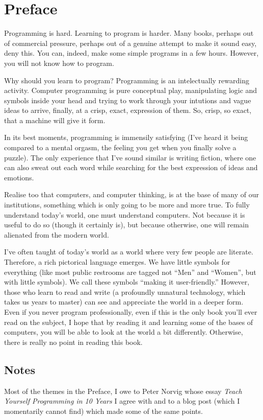 \chapter{Preface}

Programming is hard. Learning to program is harder. Many books, perhaps out of
commercial pressure, perhaps out of a genuine attempt to make it sound easy,
deny this. You can, indeed, make some simple programs in a few hours. However,
you will not know how to program.

Why should you learn to program? Programming is an intelectually rewarding
activity. Computer programming is pure conceptual play, manipulating logic and
symbols inside your head and trying to work through your intutions and vague
ideas to arrive, finally, at a crisp, exact, expression of them. So, crisp, so
exact, that a machine will give it form.

In its best moments, programming is immensily satisfying (I've heard it being
compared to a mental orgasm, the feeling you get when you finally solve a
puzzle). The only experience that I've sound similar is writing fiction, where
one can also sweat out each word while searching for the best expression of
ideas and emotions.

Realise too that computers, and computer thinking, is at the base of many of
our institutions, something which is only going to be more and more true. To
fully understand today's world, one must understand computers. Not because it
is useful to do so (though it certainly is), but because otherwise, one will
remain alienated from the modern world.

I've often taught of today's world as a world where very few people are
literate. Therefore, a rich pictorical language emerges. We have little symbols
for everything (like most public restrooms are tagged not ``Men'' and
``Women'', but with little symbols). We call these symbols ``making it
user-friendly.'' However, those who learn to read and write (a profoundly
unnatural technology, which takes us years to master) can see and appreciate
the world in a deeper form. Even if you never program professionally, even if
this is the only book you'll ever read on the subject, I hope that by reading
it and learning some of the bases of computers, you will be able to look at the
world a bit differently. Otherwise, there is really no point in reading this
book.

\section*{Notes}

Most of the themes in the Preface, I owe to Peter Norvig whose essay
\emph{Teach Yourself Programming in 10 Years} I agree with and to a blog post
(which I momentarily cannot find) which made some of the same points.

